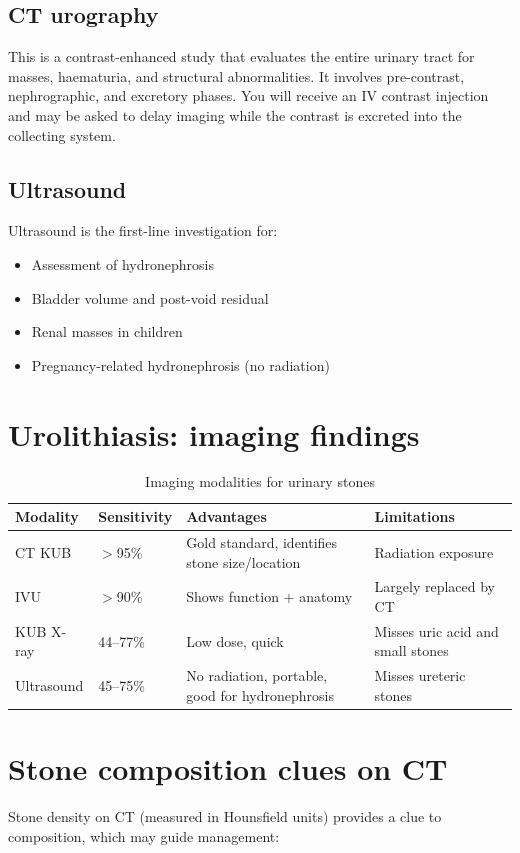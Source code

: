 \subsection{CT urography}
This is a contrast-enhanced study that evaluates the entire urinary tract for masses, haematuria, and structural abnormalities. It involves pre-contrast, nephrographic, and excretory phases. You will receive an IV contrast injection and may be asked to delay imaging while the contrast is excreted into the collecting system.

\subsection{Ultrasound}
Ultrasound is the first-line investigation for:
\begin{itemize}
    \item Assessment of hydronephrosis
    \item Bladder volume and post-void residual
    \item Renal masses in children
    \item Pregnancy-related hydronephrosis (no radiation)
\end{itemize}

\section{Urolithiasis: imaging findings}

\begin{table}[h]
\centering
\caption{Imaging modalities for urinary stones}
\label{tab:stone_modalities}
\begin{tabular}{@{}p{}p{}p{}p{}@{}}
\hline
\textbf{Modality} & \textbf{Sensitivity} & \textbf{Advantages} & \textbf{Limitations} \\
\hline
CT KUB & $>$95\% & Gold standard, identifies stone size/location & Radiation exposure \\
IVU & $>$90\% & Shows function + anatomy & Largely replaced by CT \\
KUB X-ray & 44--77\% & Low dose, quick & Misses uric acid and small stones \\
Ultrasound & 45--75\% & No radiation, portable, good for hydronephrosis & Misses ureteric stones \\
\hline
\end{tabular}
\end{table}

\section{Stone composition clues on CT}
Stone density on CT (measured in Hounsfield units) provides a clue to composition, which may guide management:

